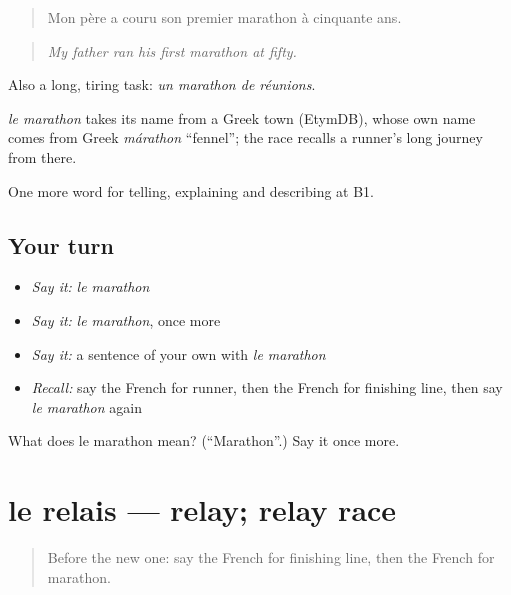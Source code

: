 \begin{quote}
Mon père a couru son premier marathon à cinquante ans.
\end{quote}

\begin{quote}
\emph{My father ran his first marathon at fifty.}
\end{quote}

Also a long, tiring task: \emph{un marathon de réunions}.

\begin{cousinweb}
\emph{le marathon} takes its name from a Greek town (EtymDB), whose own name comes from Greek \emph{márathon} \textquotedblleft{}fennel\textquotedblright{}; the race recalls a runner's long journey from there.
\end{cousinweb}

\begin{grammarlens}[title={What you've built}]
One more word for telling, explaining and describing at B1.
\end{grammarlens}

\subsection*{Your turn}
\begin{itemize}
\raggedright
  \item \emph{Say it:} \emph{le marathon}
  \item \emph{Say it:} \emph{le marathon}, once more
  \item \emph{Say it:} a sentence of your own with \emph{le marathon}
  \item \emph{Recall:} say the French for runner, then the French for finishing line, then say \emph{le marathon} again
\end{itemize}

\begin{tcolorbox}[breakable,colback=teal!4,colframe=teal!35!black,title={Before you move on}]
What does le marathon mean? (\textquotedblleft{}Marathon\textquotedblright{}.) Say it once more.
\end{tcolorbox}
\section[le relais]{le relais — relay; relay race}

\label{lesson:FR-C508-relais}



\begin{quote}
Before the new one: say the French for finishing line, then the French for marathon.
\end{quote}

